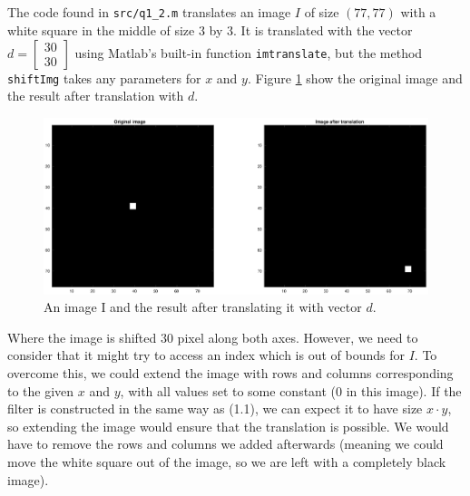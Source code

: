 \documentclass[a4paper]{article}
\begin{document}
\subsection{}
The code found in \texttt{src/q1\_2.m} translates an image $I$ of size $(77, 77)$ with a white square in the middle of size $3$ by $3$. It is translated with the vector $d=\begin{bmatrix} 30 \\ 30 \end{bmatrix}$ using Matlab's built-in function \texttt{imtranslate}, but the method \texttt{shiftImg} takes any parameters for $x$ and $y$. Figure \ref{fig1} show the original image and the result after translation with $d$.
\begin{figure}[H]
  \centering
  \captionsetup{justification=centering}
  \includegraphics[width=\textwidth]{fig1.eps}
  \caption{An image I and the result after translating it with vector $d$.}
  \label{fig1}
\end{figure}
Where the image is shifted $30$ pixel along both axes. However, we need to consider that it might try to access an index which is out of bounds for $I$. To overcome this, we could extend the image with rows and columns corresponding to the given $x$ and $y$, with all values set to some constant ($0$ in this image). If the filter is constructed in the same way as (1.1), we can expect it to have size $x\cdot y$, so extending the image would ensure that the translation is possible. We would have to remove the rows and columns we added afterwards (meaning we could move the white square out of the image, so we are left with a completely black image).
\end{document}
